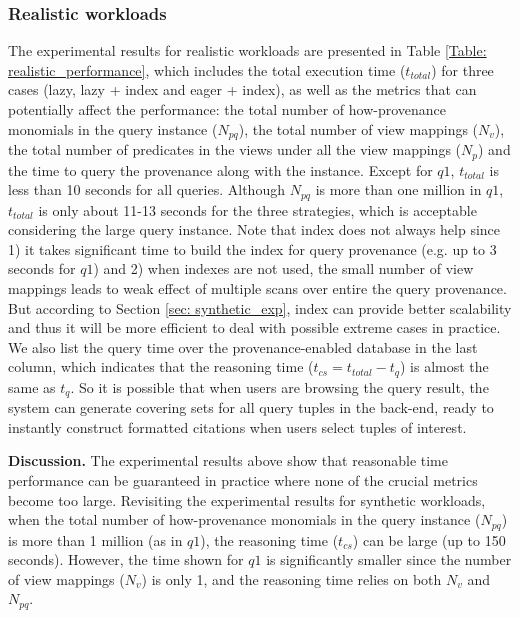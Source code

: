 \subsubsection{Realistic workloads}
\label{ssec: realistic}
The experimental results for realistic workloads are presented in Table \ref{Table: realistic_performance}, which includes the total execution time ($t_{total}$) for three cases (lazy, lazy + index and eager + index), as well as the metrics that can potentially affect the performance: the total number of how-provenance monomials in the query instance ($N_{pq}$), the total number of view mappings ($N_v$), the total number of predicates in the views under all the view mappings ($N_p$) and the time to query the provenance along with the instance. Except for $q1$, $t_{total}$ is less than 10 seconds for all queries. Although $N_{pq}$ is more than one million in $q1$, $t_{total}$ is only about 11-13 seconds for the three strategies, which is acceptable considering the large query instance. Note that index does not always help since 1) it takes significant time to build the index for query provenance (e.g. up to 3 seconds for $q1$) and 2) when indexes are not used, the small number of view mappings leads to weak effect of multiple scans over entire the query provenance. But according to Section \ref{sec: synthetic_exp}, index can provide better scalability and thus it will be more efficient to deal with possible extreme cases in practice. We also list the query time over the provenance-enabled database in the last column, which indicates that the reasoning time ($t_{cs} = t_{total} - t_{q}$) is almost the same as $t_{q}$. So it is possible that when users are browsing the query result, the system can generate covering sets for all query tuples in the back-end, ready to instantly construct formatted citations when users select tuples of interest.


{\bf Discussion.} The experimental results above show that reasonable time performance can be guaranteed in practice where none of the crucial metrics become too large.  Revisiting the experimental results for synthetic workloads, when the total number of how-provenance monomials in the query instance ($N_{pq}$) is more than 1 million (as in $q1$), the reasoning time ($t_{cs}$) can be large (up to 150 seconds). However, the time shown for $q1$ is significantly smaller since the number of view mappings ($N_v$) is only 1, and the reasoning time relies on both $N_v$ and $N_{pq}$.




